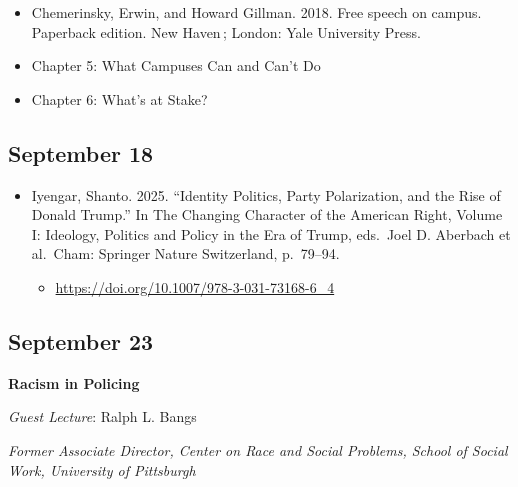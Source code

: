 \documentclass[]{tufte-handout}
\providecommand{\tightlist}{%
  \setlength{\itemsep}{0pt}\setlength{\parskip}{0pt}}
\begin{document}
\begin{itemize}
\tightlist
\item
  Chemerinsky, Erwin, and Howard Gillman. 2018. Free speech on campus.
  Paperback edition. New Haven\,; London: Yale University Press.
\item
  Chapter 5: What Campuses Can and Can't Do
\item
  Chapter 6: What's at Stake?
\end{itemize}

\hypertarget{september-18}{%
\subsection{September 18}\label{september-18}}

\begin{itemize}
\tightlist
\item
  Iyengar, Shanto. 2025. ``Identity Politics, Party Polarization, and
  the Rise of Donald Trump.'' In The Changing Character of the American
  Right, Volume I: Ideology, Politics and Policy in the Era of Trump,
  eds.~Joel D. Aberbach et al.~Cham: Springer Nature Switzerland,
  p.~79--94.

  \begin{itemize}
  \tightlist
  \item
    \url{https://doi.org/10.1007/978-3-031-73168-6_4}
  \end{itemize}
\end{itemize}

\hypertarget{september-23}{%
\subsection{September 23}\label{september-23}}

\textbf{Racism in Policing}

\emph{Guest Lecture}: Ralph L. Bangs

\emph{Former Associate Director, Center on Race and Social Problems,
School of Social Work, University of Pittsburgh}
\end{document}
